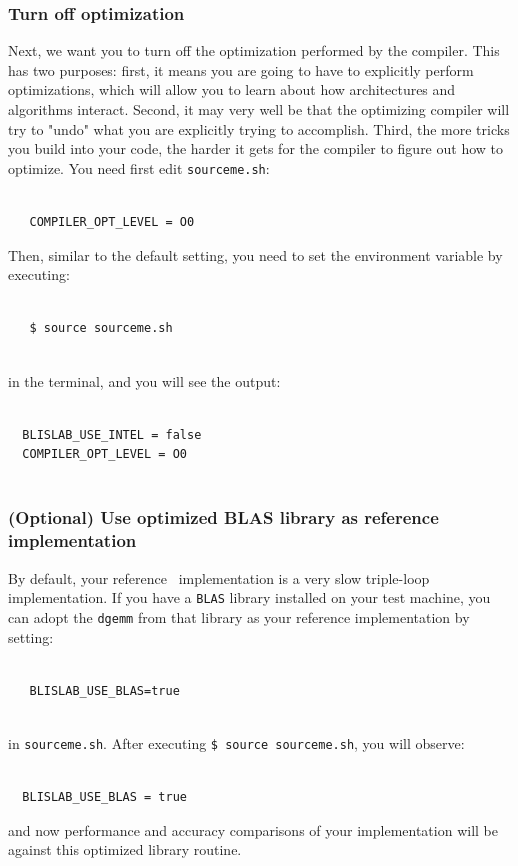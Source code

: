 \subsubsection{Turn off optimization}

Next, we want you to turn off the optimization performed by the compiler.  This has two purposes: first, it means you are going to have to explicitly perform optimizations, which will allow you to learn about how architectures and algorithms interact.  Second, it may very well be that the optimizing compiler will try to "undo" what you are explicitly trying to accomplish.  Third, the more tricks you build into your code, the harder it gets for the compiler to figure out how to optimize.
You need first edit {\tt sourceme.sh}: 
\begin{verbatim}

   COMPILER_OPT_LEVEL = O0

\end{verbatim}
Then, similar to the default setting, you need to set the environment variable by executing:
\begin{verbatim}

   $ source sourceme.sh
   
\end{verbatim}
in the terminal, and you will see the output:
\begin{verbatim}

  BLISLAB_USE_INTEL = false
  COMPILER_OPT_LEVEL = O0
  
\end{verbatim}

\subsubsection{(\textbf{Optional}) Use optimized BLAS library as reference implementation}

By default, your reference \Gemm\ implementation is a very slow triple-loop implementation.
If you have a {\tt BLAS} library installed on your test machine, you can adopt the {\tt dgemm} from that library as your reference implementation by setting:
\begin{verbatim}

   BLISLAB_USE_BLAS=true
   
\end{verbatim}
in {\tt sourceme.sh}. After executing {\tt \$ source sourceme.sh}, you will observe:
\begin{verbatim}

  BLISLAB_USE_BLAS = true

\end{verbatim}
and now performance and accuracy comparisons of your implementation will be against this optimized library routine.


